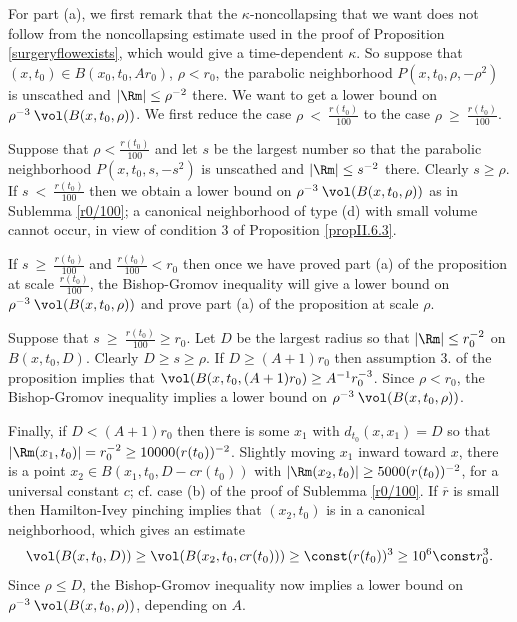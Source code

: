 For part (a),
we first remark
 that the $\kappa$-noncollapsing that we want does not follow from
the noncollapsing estimate used in the proof of Proposition
\ref{surgeryflowexists}, which would give a
time-dependent $\kappa$.
So suppose that $(x,t_0) \in B(x_0, t_0, Ar_0)$, $\rho < r_0$,
the parabolic neighborhood $P(x, t_0, \rho, - \rho^2)$ is
unscathed and $|\Rm| \le \rho^{-2}$ there. We want to get
a lower bound on $\rho^{-3} \: \vol(B(x, t_0, \rho))$.
We first reduce the case $\rho \: < \: \frac{r(t_0)}{100}$ to the
case $\rho \:\geq\: \frac{r(t_0)}{100}$.

Suppose that $\rho <
\frac{r(t_0)}{100}$ and let $s$ be the largest
number so that the parabolic neighborhood
$P(x, t_0, s, - s^2)$ is unscathed and $|\Rm| \le s^{-2}$ there.
Clearly $s \ge \rho$.
If $s \: < \: \frac{r(t_0)}{100}$ then we obtain a lower
bound on $\rho^{-3} \: \vol(B(x, t_0, \rho))$
as in Sublemma \ref{r0/100};
a canonical
neighborhood of type (d) with small volume cannot occur,
in view of condition 3 of Proposition \ref{propII.6.3}.

If $s \: \ge \: \frac{r(t_0)}{100}$ and $\frac{r(t_0)}{100} < r_0$
then once we have proved part (a) of the
proposition at scale $\frac{r(t_0)}{100}$, the Bishop-Gromov
inequality will give a lower bound on $\rho^{-3} \: \vol(B(x, t_0, \rho))$
and prove part (a) of the proposition at scale $\rho$.

Suppose that
$s \: \ge \: \frac{r(t_0)}{100} \ge r_0$. Let $D$ be the largest
radius so that $|\Rm| \le r_0^{-2}$ on $B(x,t_0, D)$.
Clearly $D \ge s \ge \rho$.
If $D \ge
(A+1) r_0$ then assumption 3. of the proposition implies that
$\vol(B(x,t_0,(A+1)r_0) \ge A^{-1} r_0^{-3}$. Since $\rho < r_0$,
the Bishop-Gromov inequality implies a lower bound on
$\rho^{-3} \: \vol(B(x, t_0, \rho))$.

Finally, if $D < (A+1)r_0$
then there is some $x_1$ with $d_{t_0}(x,x_1) = D$ so that
$|\Rm(x_1,t_0)| = r_0^{-2} \ge 10000 (r(t_0))^{-2}$. Slightly moving
$x_1$ inward toward $x$, there is a point
$x_2 \in B(x_1, t_0, D-cr(t_0))$ with
$|\Rm(x_2,t_0)| \ge 5000 (r(t_0))^{-2}$, for a universal constant $c$;
cf. case (b) of the proof of Sublemma \ref{r0/100}.
If $\overline{r}$ is small then Hamilton-Ivey pinching implies that
$(x_2, t_0)$ is in a canonical neighborhood, which gives an estimate
\begin{equation}
\vol(B(x, t_0, D)) \ge \vol(B(x_2, t_0, cr(t_0))) \ge
\const (r(t_0))^3 \ge 10^6 \const r_0^3.
\end{equation}
Since $\rho \le D$, the Bishop-Gromov inequality now implies a lower bound on
$\rho^{-3} \: \vol(B(x, t_0, \rho))$, depending on $A$.

